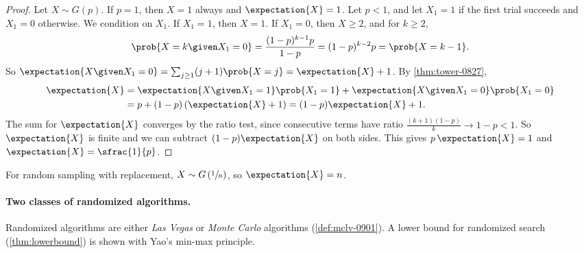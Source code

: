 \begin{proof}
    Let $X \sim G(p)$. If $p = 1$, then $X = 1$ always and $\expectation{X} = 1$. Let $p < 1$, and
    let $X_1 = 1$ if the first trial succeeds and $X_1 = 0$ otherwise. We condition on $X_1$. If
    $X_1 = 1$, then $X = 1$. If $X_1 = 0$, then $X \geq 2$, and for $k \geq 2$,
    \[\prob{X = k \given X_1 = 0} = \frac{(1-p)^{k-1} p}{1 - p} = (1-p)^{k-2} p = \prob{X = k - 1}.\]
    So $\expectation{X \given X_1 = 0} = \sum_{j \geq 1} (j + 1) \prob{X = j} = \expectation{X} + 1$.
    By \cref{thm:tower-0827},
    \begin{align*}
        \expectation{X}
         & = \expectation{X \given X_1 = 1} \prob{X_1 = 1} + \expectation{X \given X_1 = 0} \prob{X_1 = 0} \\
         & = p + (1 - p)\left(\expectation{X} + 1\right)
        = (1 - p)\expectation{X} + 1.
    \end{align*}
    The sum for $\expectation{X}$ converges by the ratio test, since consecutive terms have ratio
    $\frac{(k+1)(1-p)}{k} \to 1 - p < 1$. So $\expectation{X}$ is finite and we can subtract
    $(1 - p)\expectation{X}$ on both sides. This gives $p \, \expectation{X} = 1$ and
    $\expectation{X} = \sfrac{1}{p}$.
\end{proof}

For random sampling with replacement, $X \sim G\left(\sfrac{1}{n}\right)$, so
$\expectation{X} = n$.

\paragraph{Two classes of randomized algorithms.} Randomized algorithms are either \emph{Las Vegas}
or \emph{Monte Carlo} algorithms (\cref{def:mclv-0901}). A lower bound for randomized search
(\cref{thm:lowerbound}) is shown with Yao's min-max principle.
